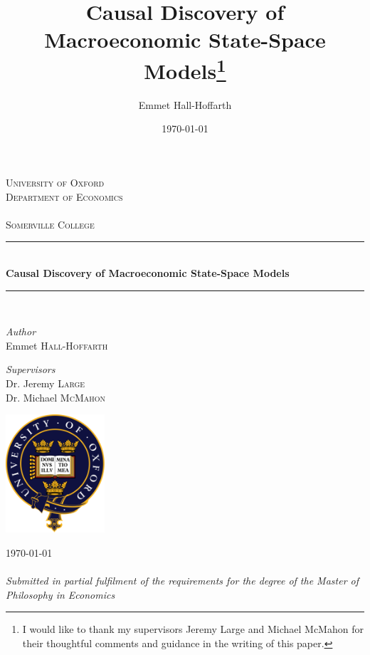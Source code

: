 \documentclass{article}
\title{Causal Discovery of Macroeconomic State-Space Models\footnote{I would like to thank my supervisors Jeremy Large and Michael McMahon for their thoughtful comments and guidance in the writing of this paper.}}
\author{Emmet Hall-Hoffarth}
\date{\today}
\begin{document}
\begin{titlepage}
	\newcommand{\HRule}{\rule{\linewidth}{0.5mm}} 
	\center
	
	\textsc{\LARGE University of Oxford}\\
  \textsc{\Large Department of Economics}\\[0.25cm]
  \\[0.5cm]
	\textsc{\LARGE Somerville College}\\[0.25cm]

	\HRule\\[0.4cm]
	
	{\huge\bfseries Causal Discovery of Macroeconomic State-Space Models}\\
	
	\HRule\\[1.5cm]
	
  \vspace{-0.5cm}
	\begin{minipage}[t]{0.4\textwidth}
		\begin{flushleft}
			\large
			\textit{Author}\\
			Emmet \textsc{Hall-Hoffarth}
		\end{flushleft}
	\end{minipage}
	\begin{minipage}[t]{0.4\textwidth}
		\begin{flushright}
			\large
			\textit{Supervisors}\\
			Dr. Jeremy \textsc{Large} \\
      Dr. Michael \textsc{McMahon}
		\end{flushright}
	\end{minipage}

	\vfill\vfill\vfill 
	
  \includegraphics[width=0.275\textwidth]{images/oxford_logo_colour.png}\\

	\vfill\vfill
	
  {\large\today}\\
  {\large{}}\\[1.25pt]
  {\large\textit{Submitted in partial fulfilment of the requirements for the degree of the Master of Philosophy in Economics}}

	\vfill
	
\end{titlepage}
\end{document}
